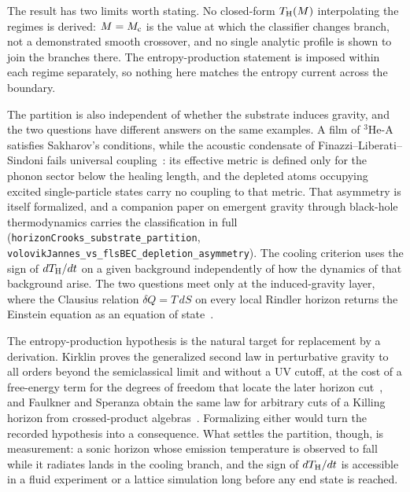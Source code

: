 \documentclass[aps,prl,reprint,nofootinbib,superscriptaddress]{revtex4-2}
\newcommand{\Thawk}{T_{\rm H}}
\newcommand{\Mc}{M_{\rm c}}
\begin{document}
The result has two limits worth stating. No closed-form $\Thawk(M)$
interpolating the regimes is derived: $M = \Mc$ is the value at which the
classifier changes branch, not a demonstrated smooth crossover, and no
single analytic profile is shown to join the branches there. The
entropy-production statement is imposed within each regime separately, so
nothing here matches the entropy current across the boundary.

The partition is also independent of whether the substrate induces gravity,
and the two questions have different answers on the same examples. A film
of $^{3}$He-A satisfies Sakharov's conditions, while the acoustic
condensate of Finazzi--Liberati--Sindoni fails universal
coupling~\cite{FinazziLiberatiSindoni2012PRL}: its effective metric is
defined only for the phonon sector below the healing length, and the
depleted atoms occupying excited single-particle states carry no coupling
to that metric. That asymmetry is itself formalized, and a companion paper
on emergent gravity through black-hole thermodynamics carries the
classification in full~\cite{Roehm2026D3}
(\texttt{horizonCrooks\_substrate\_partition},
\texttt{volovikJannes\_vs\_flsBEC\_depletion\_asymmetry}). The cooling
criterion uses the sign of $d\Thawk/dt$ on a given background independently
of how the dynamics of that background arise. The two questions
meet only at the induced-gravity layer, where the Clausius relation
$\delta Q = T\,dS$ on every local Rindler horizon returns the Einstein
equation as an equation of state~\cite{JacobsonEFE1995}.

The entropy-production hypothesis is the natural target for replacement by
a derivation. Kirklin proves the generalized second law in perturbative
gravity to all orders beyond the semiclassical limit and without a UV
cutoff, at the cost of a free-energy term for the degrees of freedom that
locate the later horizon cut~\cite{Kirklin2024GSLAllOrders}, and Faulkner
and Speranza obtain the same law for arbitrary cuts of a Killing horizon
from crossed-product algebras~\cite{FaulknerSperanza2024}. Formalizing
either would turn the recorded hypothesis into a consequence. What settles
the partition, though, is measurement: a sonic horizon whose emission
temperature is observed to fall while it radiates lands in the cooling
branch, and the sign of $d\Thawk/dt$ is accessible in a fluid experiment or
a lattice simulation long before any end state is reached.
\end{document}
